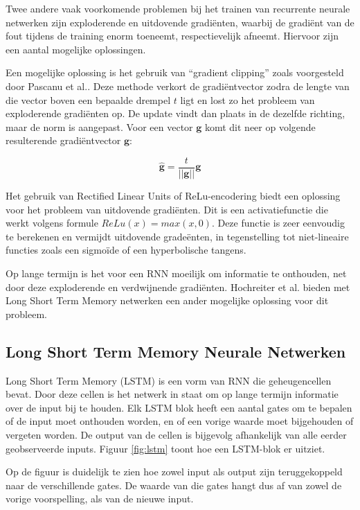 Twee andere vaak voorkomende problemen bij het trainen van recurrente neurale netwerken zijn exploderende en uitdovende gradi\"enten, waarbij de gradi\"ent van de fout tijdens de training enorm toeneemt, respectievelijk afneemt. Hiervoor zijn een aantal mogelijke oplossingen.

Een mogelijke oplossing is het gebruik van ``gradient clipping'' zoals voorgesteld door Pascanu et al.\cite{Pascanu2012}. Deze methode verkort de gradi\"entvector zodra de lengte van die vector boven een bepaalde drempel $t$ ligt en lost zo het probleem van exploderende gradi\"enten op. De update vindt dan plaats in de dezelfde richting, maar de norm is aangepast. Voor een vector $\mathbf{g}$ komt dit neer op volgende resulterende gradi\"entvector $\mathbf{\hat{g}}$:

\begin{equation}
    \mathbf{\hat{g}} = \frac{t}{||\mathbf{g}||}\mathbf{g}
\end{equation}

Het gebruik van Rectified Linear Units of ReLu-encodering biedt een oplossing voor het probleem van uitdovende gradi\"enten. Dit is een activatiefunctie die werkt volgens formule $ReLu(x) = max(x,0)$. Deze functie is zeer eenvoudig te berekenen en vermijdt uitdovende grade\"enten, in tegenstelling tot niet-lineaire functies zoals een sigmo\"ide of een hyperbolische tangens\cite{Glorot2011}.

Op lange termijn is het voor een RNN moeilijk om informatie te onthouden, net door deze exploderende en verdwijnende gradi\"enten. Hochreiter et al.\cite{SeppHochreiter1997} bieden met Long Short Term Memory netwerken een ander mogelijke oplossing voor dit probleem.

\subsection{Long Short Term Memory Neurale Netwerken}
\label{sub:lstm}
Long Short Term Memory (LSTM) is een vorm van RNN die geheugencellen bevat. Door deze cellen is het netwerk in staat om op lange termijn informatie over de input bij te houden. Elk LSTM blok heeft een aantal gates om te bepalen of de input moet onthouden worden, en of een vorige waarde moet bijgehouden of vergeten worden. De output van de cellen is bijgevolg afhankelijk van alle eerder geobserveerde inputs. Figuur \ref{fig:lstm} toont hoe een LSTM-blok er uitziet.\cite{SeppHochreiter1997,Google}

Op de figuur is duidelijk te zien hoe zowel input als output zijn teruggekoppeld naar de verschillende gates. De waarde van die gates hangt dus af van zowel de vorige voorspelling, als van de nieuwe input.

